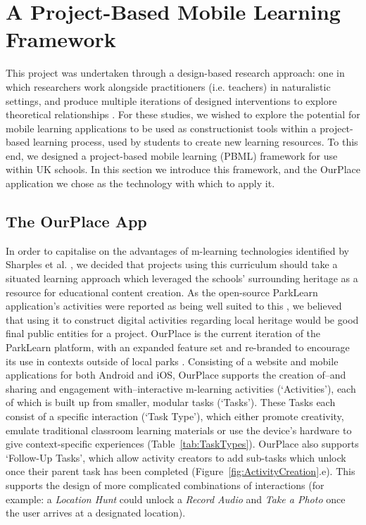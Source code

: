 \documentclass[,hyphens]{sigchi}
\begin{document}
\section{A Project-Based Mobile Learning Framework}
This project was undertaken through a design-based research approach: one in which researchers work alongside practitioners (i.e. teachers) in naturalistic settings, and produce multiple iterations of designed interventions to explore theoretical relationships \cite{Barab2004}. For these studies, we wished to explore the potential for mobile learning applications to be used as constructionist tools within a project-based learning process, used by students to create new learning resources. To this end, we designed a project-based mobile learning (PBML) framework for use within UK schools. In this section we introduce this framework, and the OurPlace application we chose as the technology with which to apply it.

\subsection{The OurPlace App}
In order to capitalise on the advantages of m-learning technologies identified by Sharples et al. \cite{Sharples2007}, we decided that projects using this curriculum should take a situated learning approach which leveraged the schools' surrounding heritage as a resource for educational content creation. As the open-source ParkLearn application's activities were reported as being well suited to this \cite{Richardson2018}, we believed that using it to construct digital activities regarding local heritage would be good final public entities for a project. OurPlace is the current iteration of the ParkLearn platform, with an expanded feature set and re-branded to encourage its use in contexts outside of local parks \cite{Richardson2018a}. Consisting of a website and mobile applications for both Android and iOS, OurPlace supports the creation of--and sharing and engagement with--interactive m-learning activities (`Activities'), each of which is built up from smaller, modular tasks (`Tasks'). These Tasks each consist of a specific interaction (`Task Type'), which either promote creativity, emulate traditional classroom learning materials or use the device's hardware to give context-specific experiences (Table~\ref{tab:TaskTypes}). OurPlace also supports `Follow-Up Tasks', which allow activity creators to add sub-tasks which unlock once their parent task has been completed (Figure~\ref{fig:ActivityCreation}.e). This supports the design of more complicated combinations of interactions (for example: a \textit{Location Hunt} could unlock a \textit{Record Audio} and \textit{Take a Photo} once the user arrives at a designated location).
\end{document}
